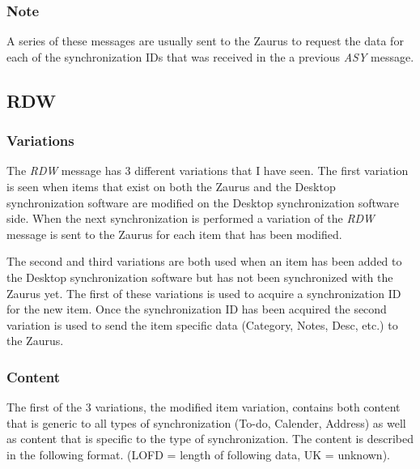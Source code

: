             \subsubsection{Note}

            A series of these messages are usually sent to the Zaurus to
            request the data for each of the synchronization IDs that was
            received in the a previous \emph{ASY} message.

        \subsection{RDW}

            \subsubsection{Variations}

            The \emph{RDW} message has 3 different variations that I have
            seen. The first variation is seen when items that exist on both
            the Zaurus and the Desktop synchronization software are modified
            on the Desktop synchronization software side. When the next
            synchronization is performed a variation of the \emph{RDW} message
            is sent to the Zaurus for each item that has been modified.

            The second and third variations are both used when an item has
            been added to the Desktop synchronization software but has not
            been synchronized with the Zaurus yet. The first of these
            variations is used to acquire a synchronization ID for the new
            item. Once the synchronization ID has been acquired the second
            variation is used to send the item specific data (Category, Notes,
            Desc, etc.) to the Zaurus.

            \subsubsection{Content}

            The first of the 3 variations, the modified item variation,
            contains both content that is generic to all types of
            synchronization (To-do, Calender, Address) as well as content that
            is specific to the type of synchronization. The content is
            described in the following format. (LOFD = length of following
            data, UK = unknown).

